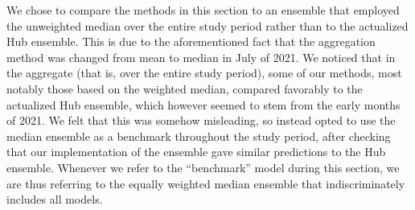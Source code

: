 We chose to compare the methods in this section to an ensemble that employed the unweighted median over the entire study period rather than to the actualized Hub ensemble. This is due to the aforementioned fact that the aggregation method was changed from mean to median in July of 2021. We noticed that in the aggregate (that is, over the entire study period), some of our methods, most notably those based on the weighted median, compared favorably to the actualized Hub ensemble, which however seemed to stem from the early months of 2021. We felt that this was somehow misleading, so instead opted to use the median ensemble as a benchmark throughout the study period, after checking that our implementation of the ensemble gave similar predictions to the Hub ensemble. Whenever we refer to the ``benchmark'' model during this section, we are thus referring to the equally weighted median ensemble that indiscriminately includes all models.\\
